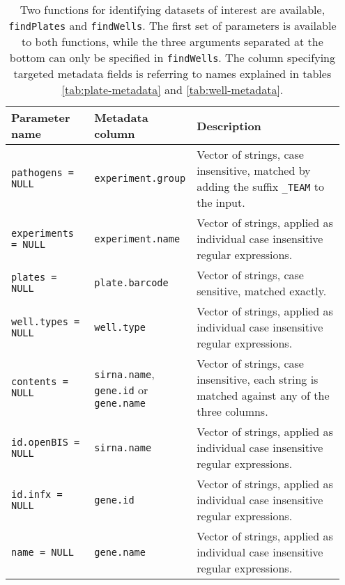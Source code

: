 \renewcommand{\arraystretch}{1.6}
\setlength{\tabcolsep}{0.2em}
\begin{table}
  \centering
  \caption[Arguments accepted by dataset search functions.]{Two functions for identifying datasets of interest are available, \texttt{findPlates} and \texttt{findWells}. The first set of parameters is available to both functions, while the three arguments separated at the bottom can only be specified in \texttt{findWells}. The column specifying targeted metadata fields is referring to names explained in tables \ref{tab:plate-metadata} and \ref{tab:well-metadata}.}
  \label{tab:dataset-search}
  \footnotesize
  \begin{tabular}{L{0.25\linewidth}L{0.25\linewidth}L{0.45\linewidth}}
    Parameter name &
      Metadata column &
      Description \\
    \hline 
    \texttt{pathogens = NULL} &
      \texttt{experiment.group} &
      Vector of strings, case insensitive, matched by adding the suffix \texttt{_TEAM} to the input. \\
    \texttt{experiments = NULL} &
      \texttt{experiment.name} &
      Vector of strings, applied as individual case insensitive regular expressions. \\
    \texttt{plates = NULL} &
      \texttt{plate.barcode} &
      Vector of strings, case sensitive, matched exactly. \\
    \texttt{well.types = NULL} &
      \texttt{well.type} &
      Vector of strings, applied as individual case insensitive regular expressions. \\
    \texttt{contents = NULL} &
      \texttt{sirna.name}, \texttt{gene.id} or \texttt{gene.name} &
      Vector of strings, case insensitive, each string is matched against any of the three columns. \\
    \texttt{id.openBIS = NULL} &
      \texttt{sirna.name} &
      Vector of strings, applied as individual case insensitive regular expressions. \\
    \texttt{id.infx = NULL} &
      \texttt{gene.id} &
      Vector of strings, applied as individual case insensitive regular expressions. \\
    \texttt{name = NULL} &
      \texttt{gene.name} &
      Vector of strings, applied as individual case insensitive regular expressions. \\

\end{tabular}
\end{table}
